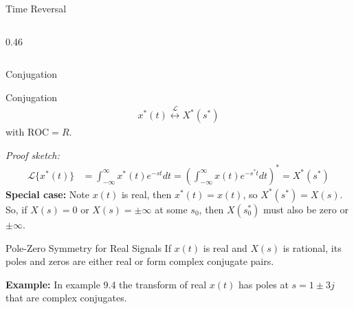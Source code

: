 \begin{frame}[t]{Time Reversal}
\begin{columns}[T]
\begin{column}{0.46\textwidth}
\begin{center}
      \end{center}
    \end{column}
  \end{columns}
\end{frame}

\begin{frame}[t]{Conjugation}
  \small
  \begin{conceptbox}{Conjugation}
    \begin{align*}
      x^*(t) \stackrel{\mathcal{L}}{\longleftrightarrow} X^*(s^*)
    \end{align*}
    with $\text{ROC}=R$.
  \end{conceptbox}

  \textit{Proof sketch:}
  \begin{align*}
    \mathcal{L}\{x^*(t)\}
    & = \int_{-\infty}^{\infty} x^*(t) e^{-st} dt
    = \left(\int_{-\infty}^{\infty} x(t) e^{-s^* t} dt\right)^*
    = X^*(s^*)
  \end{align*}
  \textbf{Special case:}
  Note $x(t)$ is real, then $x^*(t)=x(t)$, so $X^*(s^*)=X(s)$.
  So, if $X(s) = 0$ or $X(s) = \pm \infty$ at some $s_0$, then $X(s_0^*)$ must also be zero or $\pm \infty$.
  \begin{insightbox}{Pole-Zero Symmetry for Real Signals}
    If $x(t)$ is real and $X(s)$ is rational, its poles and zeros are either real or form complex conjugate pairs.
  \end{insightbox}

  \textbf{Example:} In example 9.4 the transform of real $x(t)$ has poles at $s=1\pm 3j$ that are complex conjugates.
\end{frame}

